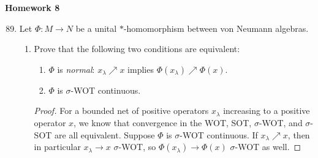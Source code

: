 \documentclass[a4paper,10pt]{report}
\begin{document}

\pagestyle{fancy}	
\fancyhf{} %
\setlength{\headheight}{60pt}

\begin{center}
	\textbf{Homework 8}
\end{center}

\begin{enumerate}
		\setcounter{enumi}{88}
	\item Let $\Phi : M \to N$ be a unital $*$-homomorphism between von Neumann algebras.
		\begin{enumerate}
			\item Prove that the following two conditions are equivalent:
			\begin{enumerate}
				\item	$\Phi$ is \emph{normal}: $x_\lambda \nearrow x$
				implies $\Phi(x_\lambda) \nearrow \Phi(x)$.
				\item	$\Phi$ is $\sigma$-WOT continuous.
			\end{enumerate}
			\begin{proof}
			For a bounded net of positive operators $x_\lambda$ increasing to a positive operator $x$, we know that convergence in the WOT, SOT, $\sigma$-WOT, and $\sigma$-SOT are all equivalent. Suppose $\Phi$ is $\sigma$-WOT continuous. If $x_\lambda\nearrow x$, then in particular $x_\lambda\to x$ $\sigma$-WOT, so $\Phi(x_\lambda)\to\Phi(x)$ $\sigma$-WOT as well.
			

\end{proof}
\end{enumerate}
\end{enumerate}
\end{document}
